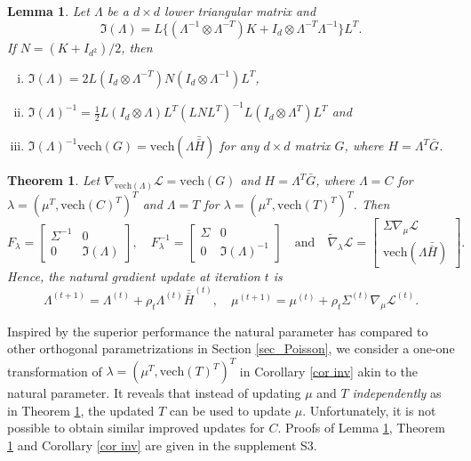 \documentclass{statsoc}
\newtheorem{theorem}{Theorem}
\newtheorem{lemma}{Lemma}
\newcommand\mL{{\mathcal{L}}}
\newcommand{\vech}{\text{vech}}
\newcommand{\dH}{\bar{\bar{H}}}
\begin{document}
\begin{lemma} \label{lem inv}
Let $\Lambda$ be a $d \times d$ lower triangular matrix  and 
\[
\mathfrak{I}(\Lambda) = L\{ (\Lambda^{-1} \otimes  \Lambda^{-T })K + I_d \otimes \Lambda^{-T }\Lambda^{-1}  \} L^T.
\]
If $N = (K+ I_{d^2})/2$, then 
\begin{enumerate}[(i)]
\item $\mathfrak{I}(\Lambda) = 2 L ( I_d \otimes \Lambda^{-T })N ( I_d \otimes \Lambda^{-1})L^T $,
\item $\mathfrak{I}(\Lambda)^{-1} = \tfrac{1}{2}L ( I_d \otimes \Lambda) L^T (L N L^T )^{-1}L (I_d \otimes \Lambda^T ) L^T $ and 
\item $\mathfrak{I}(\Lambda)^{-1} \vech(G) = \vech(\Lambda \dH)$ for any $d \times d$ matrix $G$, where $H = \Lambda^T  \bar{G}$.
\end{enumerate}
\end{lemma}

\begin{theorem} \label{thm inv}
Let $\nabla_{\vech(\Lambda)} \mL = \vech(G)$ and $H = \Lambda^T  \bar{G}$, where $\Lambda = C$ for $\lambda = (\mu^T , \vech(C)^T )^T$ and $\Lambda = T$ for $\lambda = (\mu^T , \vech(T)^T )^T$. Then 
\[
F_\lambda= \begin{bmatrix} \Sigma^{-1} & 0 \\ 0 & \mathfrak{I}(\Lambda) \end{bmatrix}, \quad 
F_\lambda^{-1}= \begin{bmatrix} \Sigma & 0 \\ 0 & \mathfrak{I}(\Lambda)^{-1} \end{bmatrix} \quad \text{and} \quad
\widetilde{\nabla}_\lambda \mL = \begin{bmatrix} \Sigma \nabla_\mu \mL \\ \vech(\Lambda \dH) \end{bmatrix}.
\]
Hence, the natural gradient update at iteration $t$ is 
\[
\Lambda^{(t+1)} = \Lambda^{(t)} + \rho_t \Lambda^{(t)} \dH^{(t)},
\quad 
\mu^{(t+1)} = \mu^{(t)} + \rho_t \Sigma^{(t)} \nabla_\mu \mL^{(t)}.
\]
\end{theorem}

Inspired by the superior performance the natural parameter has compared to other orthogonal parametrizations in Section \ref{sec_Poisson}, we consider a one-one transformation of $\lambda = (\mu^T , \vech(T)^T )^T$ in Corollary \ref{cor inv} akin to the natural parameter. It reveals that instead of updating $\mu$ and $T$ {\em independently} as in Theorem \ref{thm inv}, the updated $T$ can be used to update $\mu$. Unfortunately, it is not possible to obtain similar improved updates for $C$. Proofs of Lemma \ref{lem inv}, Theorem \ref{thm inv} and Corollary \ref{cor inv} are given in the supplement S3. 
\end{document}
